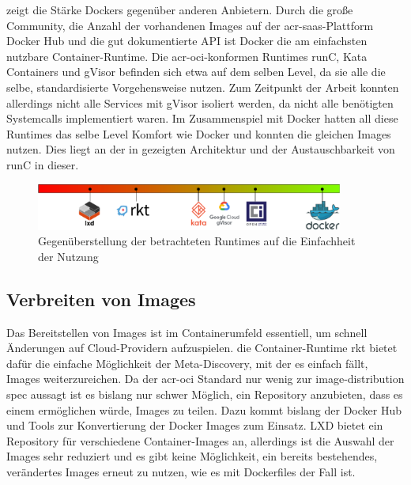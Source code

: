  zeigt die Stärke Dockers gegenüber anderen Anbietern. Durch die große Community, die Anzahl der vorhandenen Images auf der \gls{acr-saas}-Plattform Docker Hub und die gut dokumentierte API ist Docker die am einfachsten nutzbare Container-Runtime. Die \gls{acr-oci}-konformen Runtimes runC, Kata Containers und gVisor befinden sich etwa auf dem selben Level, da sie alle die selbe, standardisierte Vorgehensweise nutzen. Zum Zeitpunkt der Arbeit konnten allerdings nicht alle Services mit gVisor isoliert werden, da nicht alle benötigten Systemcalls implementiert waren. Im Zusammenspiel mit Docker hatten all diese Runtimes das selbe Level Komfort wie Docker und konnten die gleichen Images nutzen. Dies liegt an der in  gezeigten Architektur und der Austauschbarkeit von runC in dieser.

\begin{figure}[h]
	\begin{center}
		\includegraphics[width=0.9\textwidth]{bilder/rating-eou.pdf}
		\caption{Gegenüberstellung der betrachteten Runtimes auf die Einfachheit der Nutzung}
		\label{fig:compFazitEoU}
	\end{center}
\end{figure}

\subsection{Verbreiten von Images}
\label{sec:comFazitShare}

Das Bereitstellen von Images ist im Containerumfeld essentiell, um schnell Änderungen auf Cloud-Providern aufzuspielen. die Container-Runtime rkt bietet dafür die einfache Möglichkeit der Meta-Discovery, mit der es einfach fällt, Images weiterzureichen. Da der \gls{acr-oci} Standard nur wenig zur image-distribution spec aussagt ist es bislang nur schwer Möglich, ein Repository anzubieten, dass es einem ermöglichen würde, Images zu teilen. Dazu kommt bislang der Docker Hub und Tools zur Konvertierung der Docker Images zum Einsatz. LXD bietet ein Repository für verschiedene Container-Images an, allerdings ist die Auswahl der Images sehr reduziert und es gibt keine Möglichkeit, ein bereits bestehendes, verändertes Images erneut zu nutzen, wie es mit Dockerfiles der Fall ist. 

